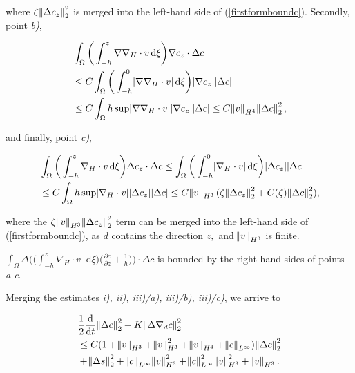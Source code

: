 \documentclass[11pt]{article}
\newcommand*\diff{\mathop{}\!\mathrm{d}}
\begin{document}
\begin{enumerate}
where $ \zeta \norm{\Delta c_z}_2^2$ is merged into the left-hand side of (\ref{firstformboundc}). Secondly, point \textit{b)},

\begin{equation}
  \begin{split}
    & \int_\Omega \bigg ( \int_{-h}^z \nabla \nabla_H \cdot v \diff \xi \bigg)  \nabla c_z \cdot \Delta c \\
    & \leq C \int_\Omega \bigg ( \int_{-h}^0 \abs{\nabla \nabla_H \cdot v} \diff \xi \bigg)  \abs{\nabla c_z} \abs{\Delta c} \\
    & \leq C \int_\Omega h \sup \abs{\nabla \nabla_H \cdot v} \abs{\nabla c_z} \abs{\Delta c} \leq C \norm{v}_{H^4} \norm{\Delta c}_2^2,
  \end{split}
\end{equation}

and finally, point \textit{c)},

\begin{equation}
  \begin{split}
    & \int_\Omega \bigg ( \int_{-h}^z \nabla_H \cdot v \diff \xi \bigg) \Delta c_z  \cdot \Delta c \leq \int_\Omega \bigg ( \int_{-h}^0 \abs{\nabla_H \cdot v} \diff \xi \bigg)  \abs{\Delta c_z} \abs{\Delta c}\\
    & \leq C \int_\Omega h \sup{\abs{\nabla_H \cdot v}} \abs{\Delta c_z} \abs{\Delta c} \leq C \norm{v}_{H^3} (\zeta \norm{\Delta c_z}_2^2 + C(\zeta)\norm{\Delta c}_2^2 ),
  \end{split}
\end{equation}

where the $\zeta \norm{v}_{H^3} \norm{\Delta c_z}_2^2$ term can be merged into the left-hand side of (\ref{firstformboundc}), as $d$ contains the direction $z,$ and $\norm{v}_{H^3}$ is finite.

$\int_\Omega \Delta \bigg ( \bigg ( \int_{-h}^z \nabla_H \cdot v \diff \xi \bigg) \bigg ( \frac{\partial c}{\partial z}+ \frac{1}{h}\bigg) \bigg ) \cdot \Delta c$ is bounded by the right-hand sides of points \textit{a-c}.

\end{enumerate}

Merging the estimates \textit{i), ii), iii)/a), iii)/b), iii)/c)}, we arrive to

\begin{equation}
  \begin{split}
    & \frac{1}{2} \frac{\diff}{\diff t} \norm{\Delta c}_2^2 + K \norm{\Delta \nabla_d c}_2^2 \\
    & \leq  C (1 + \norm{v}_{H^3} + \norm{v}_{H^3}^2 + \norm{v}_{H^4} + \norm{c}_{L^\infty})\norm{\Delta c}_2^2 \\
    & + \norm{\Delta s}_2^2 + \norm{c}_{L^\infty} \norm{v}_{H^3}^2 + \norm{c}_{L^\infty}^2 \norm{v}_{H^3}^2 + \norm{v}_{H^3}.
  \end{split}
\end{equation}
\end{document}
